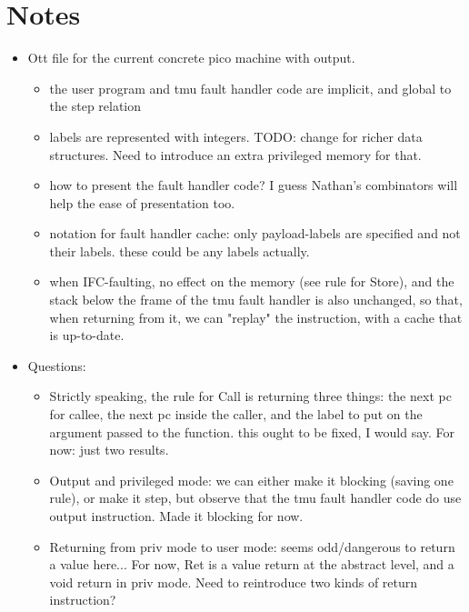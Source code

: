 \documentclass{article}
\begin{document}
\section*{Notes}

\begin{itemize}
\item Ott file for the current concrete pico machine with output.
  \begin{itemize}
    \item the user program and tmu fault handler code are implicit,
      and global to the step relation
    \item labels are represented with integers. TODO: change for
      richer data structures. Need to introduce an extra privileged
      memory for that.
    \item how to present the fault handler code? I guess Nathan's
      combinators will help the ease of presentation too.
    \item notation for fault handler cache: only payload-labels are
      specified and not their labels. these could be any labels actually.
    \item when IFC-faulting, no effect on the memory (see rule for
      Store), and the stack below the frame of the tmu fault handler
      is also unchanged, so that, when returning from it, we can
      "replay" the instruction, with a cache that is up-to-date.
  \end{itemize}
\item Questions:
  \begin{itemize}
    \item Strictly speaking, the rule for Call is returning three
      things: the next pc for callee, the next pc inside the caller,
      and the label to put on the argument passed to the function.
      this ought to be fixed, I would say. For now: just two results.
    \item Output and privileged mode: we can either make it blocking
      (saving one rule), or make it step, but observe that the tmu
      fault handler code do use output instruction. Made it blocking
      for now.
    \item Returning from priv mode to user mode: seems odd/dangerous
      to return a value here... For now, Ret is a value return at the
      abstract level, and a void return in priv mode. Need to
      reintroduce two kinds of return instruction?
  \end{itemize}
\end{itemize}
\end{document}

